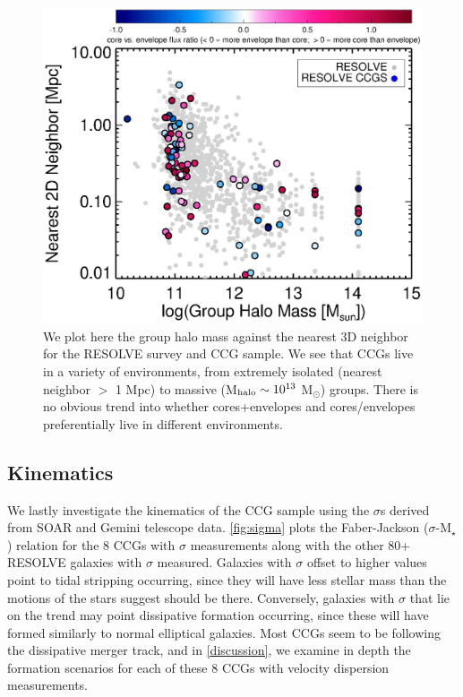 \documentclass[iop,apj]{emulateapj}
\begin{document}
\begin{figure}[hbpt!]
\begin{center}
\includegraphics{nn_groupmass_2d.eps}
\caption{We plot here the group halo mass against the nearest 3D neighbor for the RESOLVE survey and CCG sample. We see that CCGs live in a variety of environments, from extremely isolated (nearest neighbor $>$ 1 Mpc) to massive (M$_{\rm halo} \sim 10^{13}$ M$_{\odot}$) groups. There is no obvious trend into whether cores+envelopes and cores/envelopes preferentially live in different environments.}
\label{fig:envplot}
\end{center}
\end{figure}

\subsection{Kinematics}
\label{kin}
\noindent We lastly investigate the kinematics of the CCG sample using the $\sigma$s derived from SOAR and Gemini telescope data. \autoref{fig:sigma} plots the Faber-Jackson ($\sigma$-M$_{\star}$) relation for the 8 CCGs with $\sigma$ measurements along with the other 80+ RESOLVE galaxies with $\sigma$ measured. Galaxies with $\sigma$ offset to higher values point to tidal stripping occurring, since they will have less stellar mass than the motions of the stars suggest should be there. Conversely, galaxies with $\sigma$ that lie on the trend may point dissipative formation occurring, since these will have formed similarly to normal elliptical galaxies. Most CCGs seem to be following the dissipative merger track, and in \autoref{discussion}, we examine in depth the formation scenarios for each of these 8 CCGs with velocity dispersion measurements.
\end{document}
